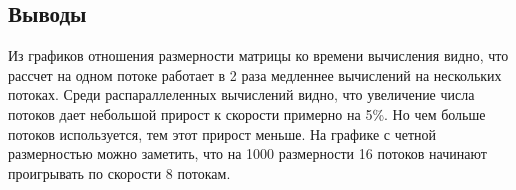 \subsection{Выводы}

Из графиков отношения размерности матрицы ко времени вычисления видно, что рассчет
на одном потоке работает в 2 раза медленнее вычислений на нескольких потоках.
Среди распараллеленных вычислений видно, что увеличение числа потоков дает
небольшой прирост к скорости примерно на 5\%. Но чем больше потоков используется, тем
этот прирост меньше. На графике с четной размерностью можно заметить, что на 1000
размерности 16 потоков начинают проигрывать по скорости 8 потокам.
